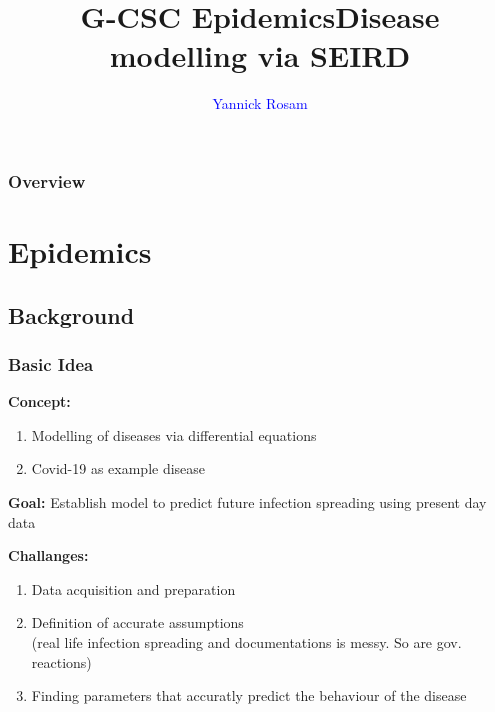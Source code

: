 \documentclass{beamer}
\title[Epidemics Wokrshop]{G-CSC Epidemics\newline Disease modelling via SEIRD}
\author{\textcolor{blue}{Yannick Rosam\\}}
\institute[G-CSC] %
{
Goethe Universtiy Frankfurt - Center for Scientific Computing \\ %
\medskip
}
\begin{document}


\begin{frame}
\titlepage %
\end{frame}


\begin{frame}
\frametitle{Overview} 
\tableofcontents 
\end{frame}



\section{Epidemics}
\subsection{Background}

\begin{frame}
	\frametitle{Basic Idea}
	\textbf{Concept:}
	\begin{enumerate}[$\bullet$]
		\item Modelling of diseases via differential equations
		\item Covid-19 as example disease\\
	\end{enumerate}
	\textit{ }\newline
	\textbf{Goal:} Establish model to predict future infection spreading using present day data\newline
	
	\textbf{Challanges:}
	\begin{enumerate}[$\bullet$]
		\item Data acquisition and preparation
		\item Definition of accurate assumptions\\
			(real life infection spreading and documentations is messy. So are gov. reactions)
		\item Finding parameters that accuratly predict the behaviour of the disease
	\end{enumerate}

\end{frame}
\end{document}
